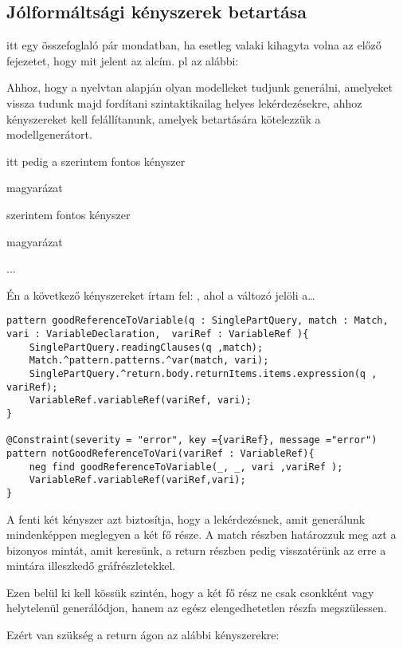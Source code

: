 \subsection{Jólformáltsági kényszerek betartása}
itt egy összefoglaló pár mondatban, ha esetleg valaki kihagyta volna az előző fejezetet, hogy mit jelent az alcím. pl az alábbi:

Ahhoz, hogy a nyelvtan alapján olyan modelleket tudjunk generálni, amelyeket vissza tudunk majd fordítani szintaktikailag helyes lekérdezésekre, ahhoz kényszereket kell felállítanunk, amelyek betartására kötelezzük a modellgenerátort.

itt pedig a szerintem fontos kényszer

magyarázat

szerintem fontos kényszer

magyarázat

...



Én a következő kényszereket írtam fel:
, ahol a  változó jelöli a\ldots

\begin{lstlisting}[style=viatrasmall]
pattern goodReferenceToVariable(q : SinglePartQuery, match : Match, vari : VariableDeclaration,  variRef : VariableRef ){	
	SinglePartQuery.readingClauses(q ,match);
	Match.^pattern.patterns.^var(match, vari);
	SinglePartQuery.^return.body.returnItems.items.expression(q , variRef);
	VariableRef.variableRef(variRef, vari);
}	

@Constraint(severity = "error", key ={variRef}, message ="error")
pattern notGoodReferenceToVari(variRef : VariableRef){
	neg find goodReferenceToVariable(_, _, vari ,variRef );
	VariableRef.variableRef(variRef,vari);
}

\end{lstlisting}


A fenti két kényszer azt biztosítja, hogy a lekérdezésnek, amit generálunk mindenképpen meglegyen a két fő része. A match részben határozzuk meg azt a bizonyos mintát, amit keresünk, a return részben pedig visszatérünk az erre a mintára illeszkedő gráfrészletekkel.

Ezen belül ki kell kössük szintén, hogy a két fő rész ne csak csonkként vagy helytelenül generálódjon, hanem az egész elengedhetetlen részfa megszülessen.

Ezért van szükség a return ágon az alábbi kényszerekre:



